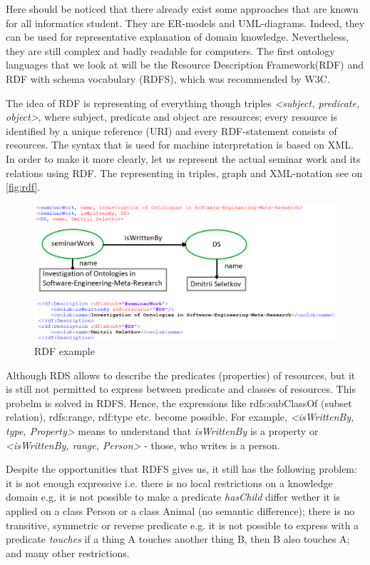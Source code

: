 		Here should be noticed that there already exist some approaches that are known for all informatics student. They are ER-models and UML-diagrams. Indeed, they can be used for representative explanation of domain knowledge. Nevertheless, they are still complex and badly readable for computers. The first ontology languages that we look at will be the Resource Description Framework(RDF) and RDF with schema vocabulary (RDFS), which was recommended by W3C\cite{w3c01}.
		
		The idea of RDF is representing of everything though triples \textit{<subject, predicate, object>}, where subject, predicate and object are resources; every resource is identified by a unique reference (URI) and every RDF-statement consists of resources. The syntax that is used for machine interpretation is based on XML. In order to make it more clearly, let us represent the actual seminar work and its relations using RDF. The representing in triples, graph and XML-notation see on \autoref{fig:rdf}.
		
		\begin{figure}
			\centering
			\includegraphics[width=16cm]{images/rdf.png}
			\caption{RDF example}
			\label{fig:rdf}
		\end{figure}  
		
		Although RDS allows to describe the predicates (properties) of resources, but it is still not permitted to express between predicate and classes of resources. This probelm is solved in RDFS. Hence, the expressions like rdfs:subClassOf (subset relation), rdfs:range, rdf:type etc. become possible. For example, \textit{<isWrittenBy, type, Property>} means to understand that \textit{isWrittenBy} is a property or \textit{<isWrittenBy, range, Person>} - those, who writes is a person.
		
		Despite the opportunities that RDFS gives us, it still has the following problem: it is not enough expressive i.e. there is no local restrictions on a knowledge domain e.g. it is not possible to make a predicate \textit{hasChild} differ wether it is applied on a class Person or a class Animal (no semantic difference); there is no transitive, symmetric or reverse predicate e.g. it is not possible to express with a predicate \textit{touches} if a thing A touches another thing B, then B also touches A; and many other restrictions.
		
